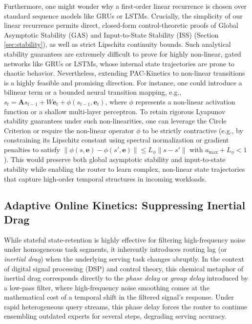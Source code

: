 Furthermore, one might wonder why a first-order linear recurrence is chosen over standard sequence models like GRUs or LSTMs. Crucially, the simplicity of our linear recurrence permits direct, closed-form control-theoretic proofs of Global Asymptotic Stability (GAS) and Input-to-State Stability (ISS) (Section \ref{sec:stability}), as well as strict Lipschitz continuity bounds. Such analytical stability guarantees are extremely difficult to prove for highly non-linear, gated networks like GRUs or LSTMs, whose internal state trajectories are prone to chaotic behavior. Nevertheless, extending \textsf{PAC-Kinetics} to non-linear transitions is a highly feasible and promising direction. For instance, one could introduce a bilinear term or a bounded neural transition mapping, e.g., $s_t = \mathbf{A}s_{t-1} + W\mathbf{e}_t + \phi(s_{t-1}, \mathbf{e}_t)$, where $\phi$ represents a non-linear activation function or a shallow multi-layer perceptron. To retain rigorous Lyapunov stability guarantees under such non-linearities, one can leverage the Circle Criterion or require the non-linear operator $\phi$ to be strictly contractive (e.g., by constraining its Lipschitz constant using spectral normalization or gradient penalties to satisfy $\|\phi(s, \mathbf{e}) - \phi(s', \mathbf{e})\| \le L_\phi \|s - s'\|$ with $a_{\max} + L_\phi < 1$). This would preserve both global asymptotic stability and input-to-state stability while enabling the router to learn complex, non-linear state trajectories that capture high-order temporal structures in incoming workloads.

\subsection{Adaptive Online Kinetics: Suppressing Inertial Drag}
\label{sec:adaptive_kinetics}
While stateful state-retention is highly effective for filtering high-frequency noise under homogeneous task segments, it inherently introduces routing lag (or \emph{inertial drag}) when the underlying serving task changes abruptly. In the context of digital signal processing (DSP) and control theory, this chemical metaphor of inertial drag corresponds directly to the \emph{phase delay} or \emph{group delay} introduced by a low-pass filter, where high-frequency noise smoothing comes at the mathematical cost of a temporal shift in the filtered signal's response. Under rapid heterogeneous query streams, this phase delay forces the router to continue ensembling outdated experts for several steps, degrading serving accuracy. 

